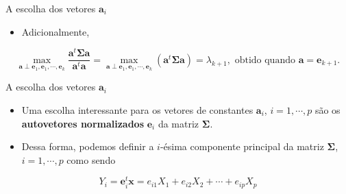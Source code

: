 \documentclass[
  ignorenonframetext,
  aspectratio=169,
]{beamer}
\providecommand{\tightlist}{%
  \setlength{\itemsep}{0pt}\setlength{\parskip}{0pt}}
\begin{document}
\begin{frame}{A escolha dos vetores \(\boldsymbol{a}_i\)}
\label{a-escolha-dos-vetores-boldsymbola_i-3}
\begin{itemize}
\tightlist
\item
  Adicionalmente,
\end{itemize}

\[\max_{\boldsymbol{a} \perp \boldsymbol{e}_1, \boldsymbol{e}_1, \cdots, \boldsymbol{e}_k} \dfrac{\boldsymbol{a}^t \boldsymbol{\Sigma} {\boldsymbol a}}{\boldsymbol{a}^t \boldsymbol{a}} = \max_{\boldsymbol{a} \perp \boldsymbol{e}_1, \boldsymbol{e}_1, \cdots, \boldsymbol{e}_k}(\boldsymbol{a}^t \boldsymbol{\Sigma} \boldsymbol{a})= \lambda_{k+1}, \text{ obtido quando } \boldsymbol{a} = \boldsymbol{e}_{k+1}.\]
\end{frame}

\begin{frame}{A escolha dos vetores \(\boldsymbol{a}_i\)}
\label{a-escolha-dos-vetores-boldsymbola_i-4}
\begin{itemize}
\tightlist
\item
  Uma escolha interessante para os vetores de constantes
  \({\boldsymbol{a}_i}\), \(i = 1, \cdots, p\) são os
  \textbf{autovetores normalizados} \({\boldsymbol{e}_i}\) da matriz
  \(\boldsymbol{\Sigma}\).
\end{itemize}

\pause

\begin{itemize}
\tightlist
\item
  Dessa forma, podemos definir a \(i\)-ésima componente principal da
  matriz \(\boldsymbol{\Sigma}\), \(i = 1, \cdots, p\) como sendo
\end{itemize}

\pause

\[Y_i = {\boldsymbol{e}_i^t}\mathbf{x} =  e_{i1}X_1 + e_{i2}X_2 + \cdots + e_{ip}X_p\]
\end{frame}
\end{document}
